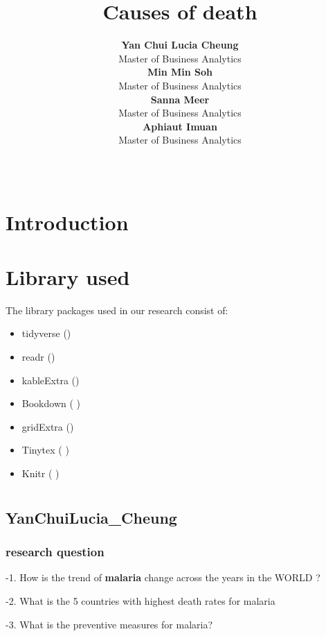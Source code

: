 \documentclass[11pt,a4paper,]{article}
\title{Causes of death}
\author{\sf\Large\textbf{ Yan Chui Lucia Cheung}\\ {\sf\large Master of Business Analytics\\[0.5cm]} \sf\Large\textbf{ Min Min Soh}\\ {\sf\large Master of Business Analytics\\[0.5cm]} \sf\Large\textbf{ Sanna Meer}\\ {\sf\large Master of Business Analytics\\[0.5cm]} \sf\Large\textbf{ Aphiaut Imuan}\\ {\sf\large Master of Business Analytics\\[0.5cm]}}
\date{\sf\Date~\Month~\Year}
\makeatletter
\providecommand{\tightlist}{%
  \setlength{\itemsep}{0pt}\setlength{\parskip}{0pt}}
\def\titlepage{\front{\expandafter{\@title}}{\@author}{\@organization}}
\makeatother
\begin{document}
\titlepage

\hypertarget{introduction}{%
\section{Introduction}\label{introduction}}

\hypertarget{library-used}{%
\section{Library used}\label{library-used}}

The library packages used in our research consist of:

\begin{itemize}
\tightlist
\item
  tidyverse (\textcite{tidyverse})
\item
  readr (\textcite{readr})
\item
  kableExtra (\textcite{kableExtra})
\item
  Bookdown (\textcite{bookdown} \textcite{bookdown1})
\item
  gridExtra (\textcite{gridExtra})
\item
  Tinytex (\textcite{tinytex} \textcite{tinytex1})
\item
  Knitr (\textcite{knitr} \textcite{knitr1})
\end{itemize}

\clearpage

\section*{}

\hypertarget{yanchuilucia_cheung}{%
\subsection{YanChuiLucia\_Cheung}\label{yanchuilucia_cheung}}

\hypertarget{research-question}{%
\subsubsection{research question}\label{research-question}}

-1. How is the trend of \textbf{malaria} change across the years in the WORLD ?

-2. What is the 5 countries with highest death rates for malaria

-3. What is the preventive measures for malaria?
\end{document}
